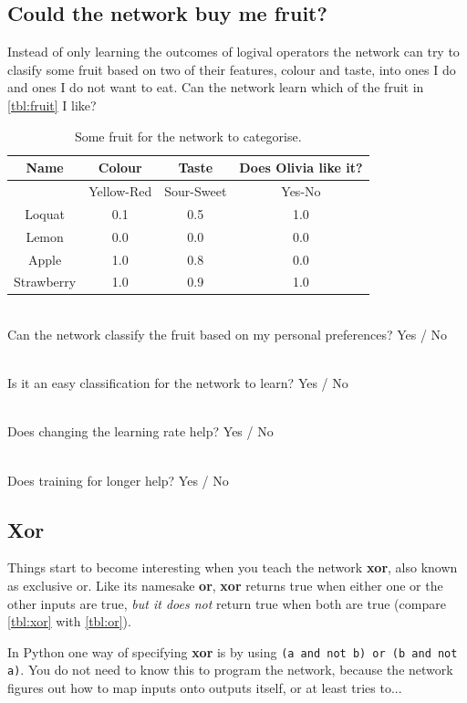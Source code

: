\documentclass[a4paper,10pt]{article}
\begin{document}
\subsection{Could the network buy me fruit?}
 Instead of only learning the outcomes of logival operators the network can try to clasify some fruit based on two of their features, colour and taste, into ones I do and ones I do not want to eat. Can the network learn which of the fruit in \autoref{tbl:fruit} I like?
 



\begin{table}[ht]
 \centering
 \begin{tabular}[t]{cccc}
Name & Colour &  Taste & Does Olivia like it? \\ \hline
& Yellow-Red & Sour-Sweet & Yes-No \\ \hline
Loquat & 0.1 & 0.5 & 1.0 \\
Lemon & 0.0 &  0.0 & 0.0 \\
Apple & 1.0 &  0.8 & 0.0 \\
Strawberry & 1.0 &  0.9 & 1.0 \\
   
\end{tabular} \caption{Some fruit for the network to categorise.}
 \label{tbl:fruit}
\end{table}


\ \\ Can the network classify the fruit based on my personal preferences?    Yes / No   

\ \\ Is it an easy classification for the network to learn? Yes / No

\ \\ Does changing the learning rate help?    Yes / No   

\ \\ Does training for longer help?    Yes / No   




\subsection{Xor}
Things start to become interesting when you teach the network \textbf{xor}, also known as exclusive or. Like its namesake \textbf{or}, \textbf{xor} returns true when either one or the other inputs are true, \emph{but it does not} return true when both are true (compare \autoref{tbl:xor} with \autoref{tbl:or}).  


In Python one way of specifying \textbf{xor} is by using \texttt{(a and not b) or (b and not a)}. You do not need to know this to program the network, because the network figures out how to map inputs onto outputs itself, or at least tries to...
\end{document}
